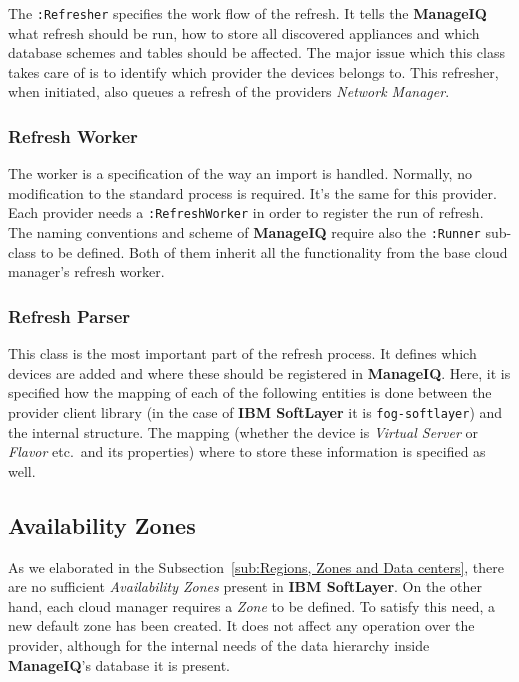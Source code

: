 The \verb|:Refresher| specifies the work flow of the refresh. It tells the \textbf{ManageIQ} what refresh should be run, how to store all discovered appliances and which database schemes and tables should be affected. The major issue which this class takes care of is to identify which provider the devices belongs to. This refresher, when initiated, also queues a refresh of the providers \emph{Network Manager}.

\subsubsection{Refresh Worker}
\label{subs:Refresh Worker}

The worker is a specification of the way an import is handled. Normally, no modification to the standard process is required. It's the same for this provider. Each provider needs a \verb|:RefreshWorker| in order to register the run of refresh. The naming conventions and scheme of \textbf{ManageIQ} require also the \verb|:Runner| sub-class to be defined. Both of them inherit all the functionality from the base cloud manager's refresh worker.

\subsubsection{Refresh Parser}
\label{subs:Refresh Parser}

This class is the most important part of the refresh process. It defines which devices are added and where these should be registered in \textbf{ManageIQ}. Here, it is specified how the mapping of each of the following entities is done between the provider client library (in the case of \textbf{IBM SoftLayer} it is \texttt{fog-softlayer}) and the internal structure. The mapping (whether the device is \emph{Virtual Server} or \emph{Flavor} etc.\ and its properties) where to store these information is specified as well.

\clearpage
\subsection{Availability Zones}
\label{sub:Availability Zones}

As we elaborated in the Subsection~\ref{sub:Regions, Zones and Data centers}, there are no sufficient \emph{Availability Zones} present in \textbf{IBM SoftLayer}. On the other hand, each cloud manager requires a \emph{Zone} to be defined. To satisfy this need, a new default zone has been created. It does not affect any operation over the provider, although for the internal needs of the data hierarchy inside \textbf{ManageIQ}'s database it is present.

